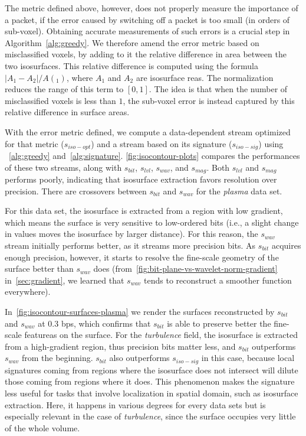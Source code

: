 The metric defined above, however, does not properly measure the importance of a packet, if the
error caused by switching off a packet is too small (in orders of sub-voxel). Obtaining accurate
measurements of such errors is a crucial step in Algorithm~\cref{alg:greedy}. We therefore amend the
error metric based on misclassified voxels, by adding to it the relative difference in area between
the two isosurfaces. This relative difference is computed using the formula $|A_1-A_2|/A(_1)$, where
$A_1$ and $A_2$ are isosurface reas. The normalization reduces the range of this term to $[0, 1]$.
The idea is that when the number of misclassified voxels is less than $1$, the sub-voxel error is
instead captured by this relative difference in surface areas.

With the error metric defined, we compute a data-dependent stream optimized for that metric
($s_{iso-opt}$) and a stream based on its signature ($s_{iso-sig}$) using ~\cref{alg:greedy}
and~\cref{alg:signature}. \cref{fig:isocontour-plots} compares the performances of these two
streams, along with $s_{bit}$, $s_{lvl}$, $s_{wav}$, and $s_{mag}$. Both $s_{lvl}$ and $s_{mag}$
performs poorly, indicating that isosurface extraction favors resolution over precision. There are
crossovers between $s_{bit}$ and $s_{wav}$ for the \emph{plasma} data set.

For this data set, the isosurface is extracted from a region with low gradient, which means the
surface is very sensitive to low-ordered bits (i.e., a slight change in values moves the isosurface
by larger distance). For this reason, the $s_{wav}$ stream initially performs better, as it streams
more precision bits. As $s_{bit}$ acquires enough precision, however, it starts to resolve the
fine-scale geometry of the surface better than $s_{wav}$ does
(from~\cref{fig:bit-plane-vs-wavelet-norm-gradient} in~\cref{sec:gradient}, we learned that
$s_{wav}$ tends to reconstruct a smoother function everywhere).

In~\cref{fig:isocontour-surfaces-plasma} we render the surfaces reconstructed by $s_{bit}$ and
$s_{wav}$ at 0.3 bps, which confirms that $s_{bit}$ is able to preserve better the fine-scale
featureas on the surface. For the \emph{turbulence} field, the isosurface is extracted from a
high-gradient region, thus precision bits matter less, and $s_{bit}$ outperforms $s_{wav}$ from the
beginning. $s_{bit}$ also outperforms $s_{iso-sig}$ in this case, because local signatures coming
from regions where the isosurface does not intersect will dilute those coming from regions where it
does. This phenomenon makes the signature less useful for tasks that involve localization in spatial
domain, such as isosurface extraction. Here, it happens in various degrees for every data sets but
is especially relevant in the case of \emph{turbulence}, since the surface occupies very little of
the whole volume.

